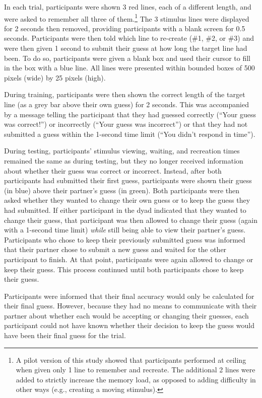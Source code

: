 \documentclass[10pt, letterpaper]{article}
\begin{document}
In each trial, participants were shown 3 red lines, each of a different
length, and were asked to remember all three of
them.\footnote{A pilot version of this study showed that participants performed at ceiling when given only 1 line to remember and recreate. The additional 2 lines were added to strictly increase the memory load, as opposed to adding difficulty in other ways (e.g., creating a moving stimulus).}
The 3 stimulus lines were displayed for 2 seconds then removed,
providing participants with a blank screen for 0.5 seconds. Participants
were then told which line to re-create (\#1, \#2, or \#3) and were then
given 1 second to submit their guess at how long the target line had
been. To do so, participants were given a blank box and used their
cursor to fill in the box with a blue line. All lines were presented
within bounded boxes of 500 pixels (wide) by 25 pixels (high).

During training, participants were then shown the correct length of the
target line (as a grey bar above their own guess) for 2 seconds. This
was accompanied by a message telling the participant that they had
guessed correctly (``Your guess was correct!'') or incorrectly (``Your
guess was incorrect'') or that they had not submitted a guess within the
1-second time limit (``You didn't respond in time'').

During testing, participants' stimulus viewing, waiting, and recreation
times remained the same as during testing, but they no longer received
information about whether their guess was correct or incorrect. Instead,
after both participants had submitted their first guess, participants
were shown their guess (in blue) above their partner's guess (in green).
Both participants were then asked whether they wanted to change their
own guess or to keep the guess they had submitted. If either participant
in the dyad indicated that they wanted to change their guess, that
participant was then allowed to change their guess (again with a
1-second time limit) \emph{while} still being able to view their
partner's guess. Participants who chose to keep their previously
submitted guess was informed that their partner chose to submit a new
guess and waited for the other participant to finish. At that point,
participants were again allowed to change or keep their guess. This
process continued until both participants chose to keep their guess.

Participants were informed that their final accuracy would only be
calculated for their final guess. However, because they had no means to
communicate with their partner about whether each would be accepting or
changing their guesses, each participant could not have known whether
their decision to keep the guess would have been their final guess for
the trial.
\end{document}
